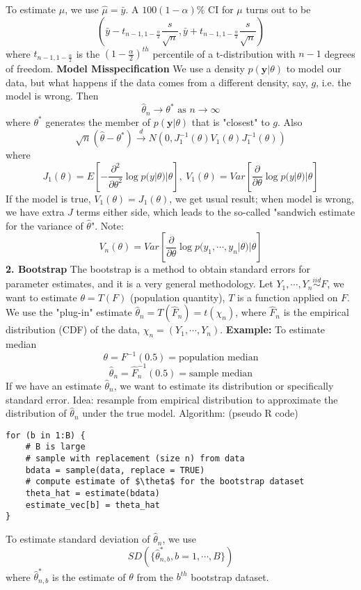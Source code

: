 \documentclass[12pt]{article}
\begin{document}
To estimate $\mu$, we use $\hat{\mu} = \bar{y}$. \newline
A $100(1-\alpha)\%$ CI for $\mu$ turns out to be
\[
	(\bar{y} - t_{n-1, 1- \frac \alpha 2}\frac{s}{\sqrt{n}}, \bar{y} + t_{n-1, 1- \frac \alpha 2}\frac{s}{\sqrt{n}})
\]
where $t_{n-1, 1- \frac \alpha 2}$ is the $(1 - \frac \alpha 2)^{th}$ percentile of a t-distribution with $n-1$ degrees of freedom.\newline \newline
\textbf{Model Misspecification} \newline
We use a density $p(\mathbf y | \theta)$ to model our data, but what happens if the data comes from a different density, say, $g$, i.e. the model is wrong. Then
\[
	\hat{\theta}_n \rightarrow \theta^* \text{ as } n \rightarrow \infty
\]
where $\theta^*$ generates the member of $p(\mathbf y | \theta)$ that is "closest" to $g$.
Also
\[
	\sqrt{n}(\hat{\theta} - \theta^*) \stackrel{d}{\rightarrow} N(0, J_1^{-1}(\theta)V_1(\theta)J_1^{-1}(\theta))
\]
where
\[
	J_1(\theta) = E[-\frac{\partial^2}{\partial \theta^2} \log p(y|\theta)|\theta],\ V_1(\theta) = Var[\frac{\partial}{\partial\theta}\log p(y|\theta)|\theta]
\]
If the model is true, $V_1(\theta) = J_1(\theta)$, we get usual result; when model is wrong, we have extra $J$ terms either side, which leads to the so-called "sandwich estimate for the variance of $\hat{\theta}$". \newline
Note:
\[
	V_n(\theta) = Var[\frac{\partial}{\partial\theta}\log p(y_1, \cdots, y_n|\theta)|\theta]
\]
\newline
\textbf{2. Bootstrap}\newline \newline
The bootstrap is a method to obtain standard errors for parameter estimates, and it is a very general methodology. \newline
Let $Y_1, \cdots, Y_n \stackrel{iid}{\sim} F$, we want to estimate $\theta = T(F)$ (population quantity), $T$ is a function applied on $F$. We use the "plug-in" estimate $\hat{\theta}_n = T(\hat{F}_n) = t(\chi_n)$, where $\hat{F}_n$ is the empirical distribution (CDF) of the data, $\chi_n = (Y_1, \cdots, Y_n)$.\newline
\textbf {Example:}\newline
To estimate median
\[
	\theta = F^{-1}(0.5) = \text{population median}
\]
\[
	\hat{\theta}_n = \hat{F}_n^{-1} (0.5) = \text{sample median}
\]
If we have an estimate $\hat{\theta}_n$, we want to estimate its distribution or specifically standard error.\newline
Idea: resample from empirical distribution to approximate the distribution of $\hat{\theta}_n$ under the true model.\newline
Algorithm: (pseudo R code) 
\lstset{language=R}
\begin{lstlisting}[texcl]
for (b in 1:B) {
	# B is large
	# sample with replacement (size n) from data
	bdata = sample(data, replace = TRUE)
	# compute estimate of $\theta$ for the bootstrap dataset
	theta_hat = estimate(bdata)
	estimate_vec[b] = theta_hat
}
\end{lstlisting}
To estimate standard deviation of $\hat{\theta}_n$, we use
\[
	SD(\{\hat{\theta}^*_{n, b}, b = 1, \cdots, B\})
\]
where $\hat{\theta}^*_{n, b}$ is the estimate of $\theta$ from the $b^{th}$ bootstrap dataset.
\end{document}
